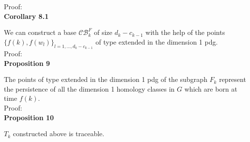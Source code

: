 \documentclass[a4paper,12pt]{article}
\numberwithin{equation}{section}
\begin{document}
	\noindent Proof:\\
	
	\noindent \textbf{Corollary 8.1}
	
	We can construct a base $\mathcal{CB}^F_k$ of size $d_k - c_{k-1}$ with the help of the points $\{f(k), f(w_l)\}_{l =1,\ldots,d_k - c_{k-1}}$ of type extended in the dimension 1 pdg.\\
	
	\noindent Proof: \\
	
	\noindent \textbf{Proposition 9}
	
	The points of type extended in the dimension 1 pdg of the subgraph $F_k$ represent the persistence of all the dimension 1 homology classes in $G$ which are born at time $f(k)$. \\
	
	\noindent Proof:\\
	
	
	
	\noindent \textbf{Proposition 10}
	
	$T_k$ constructed above is traceable.
	
	
	
	
	


	
\end{document}
